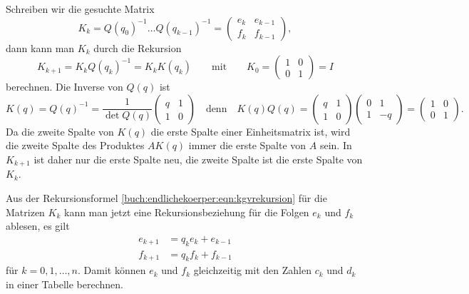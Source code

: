 Schreiben wir die gesuchte Matrix 
\[
K_k
=
Q(q_0)^{-1}\dots Q(q_{k-1})^{-1}
=
\begin{pmatrix}
e_k & e_{k-1}\\
f_k & f_{k-1}
\end{pmatrix},
\]
dann kann man $K_k$ durch die Rekursion
\begin{equation}
K_{k+1}
=
K_{k} Q(q_k)^{-1} 
=
K_k K(q_k)
\qquad\text{mit}\qquad
K_0 = \begin{pmatrix}1&0\\0&1\end{pmatrix} = I
\label{buch:endlichekoerper:eqn:kgvrekursion}
\end{equation}
berechnen.
Die Inverse von $Q(q)$ ist
\[
K(q)
=
Q(q)^{-1}
=
\frac{1}{\det Q(q)}
\begin{pmatrix}
q&1\\
1&0
\end{pmatrix}
\quad\text{denn}\quad
K(q)Q(q)
=
\begin{pmatrix}
q&1\\
1&0
\end{pmatrix}
\begin{pmatrix}
0&1\\
1&-q
\end{pmatrix}
=
\begin{pmatrix}
1&0\\
0&1
\end{pmatrix}.
\]
Da die zweite Spalte von $K(q)$ die erste Spalte einer Einheitsmatrix
ist, wird die zweite Spalte des Produktes $AK(q)$ immer die erste Spalte
von $A$ sein.
In $K_{k+1}$ ist daher nur die erste Spalte neu, die zweite Spalte ist
die erste Spalte von $K_k$.

Aus der Rekursionsformel \eqref{buch:endlichekoerper:eqn:kgvrekursion}
für die Matrizen $K_k$ kann man jetzt eine Rekursionsbeziehung
für die Folgen $e_k$ und $f_k$ ablesen, es gilt
\begin{align*}
e_{k+1} &= q_ke_k + e_{k-1} \\
f_{k+1} &= q_kf_k + f_{k-1}
\end{align*}
für $k=0,1,\dots ,n$.
Damit können $e_k$ und $f_k$ gleichzeitig mit den Zahlen $c_k$ und $d_k$
in einer Tabelle berechnen.


